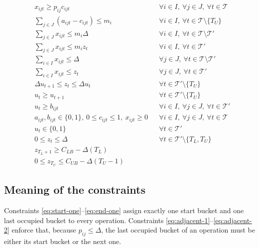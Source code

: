 \documentclass[11pt]{article}
\begin{document}
\begin{subequations}
\begin{align}
& x_{ijt} \ge p_{ij} c_{ijt} && \forall i \in I, \ \forall j \in J, \ \forall t \in \mathcal{T}
\label{eq:same-bucket-activation} \\
& \sum_{j \in J} (a_{ijt}-c_{ijt}) \leq m_i && \forall i \in I, \ \forall t \in \mathcal{T} \setminus \{T_U\}
\label{eq:machine-capacity} \\
& \sum_{j\in J} x_{ijt} \le m_i\Delta && \forall i\in I,\ \forall t \in \mathcal{T} \setminus \mathcal{T}' 
\label{eq:stage-capacity}\\
& \sum_{j\in J} x_{ijt} \leq m_i z_t  && \forall i\in I, \ \forall t \in \mathcal{T}'
\label{eq:z-average}\\
& \sum_{i\in I} x_{ijt} \le \Delta && \forall j\in J,\ \forall t \in \mathcal{T} \setminus \mathcal{T}'
\label{eq:job-bucket-capacity}\\
& \sum_{i \in I} x_{ijt} \leq z_t && \forall j\in J, \ \forall t \in \mathcal{T}'
\label{eq:z-single}\\
& \Delta u_{t+1} \leq z_t \leq \Delta u_t && \forall t \in \mathcal{T}' \setminus \{T_U\} 
\label{eq:u-z-relationship} \\
& u_{t} \geq u_{t+1} && \forall t \in \mathcal{T}' \setminus \{T_U\}
\label{eq:u-left-aligned} \\
& u_t \geq b_{ijt} && \forall i \in I, \ \forall j \in J, \ \forall t \in \mathcal{T}' 
\label{eq:u-b-relationship} \\
& a_{ijt},b_{ijt}\in\{0,1\},\ 0 \le c_{ijt} \le 1, \ x_{ijt}\ge 0 && \forall i\in I,\ \forall j\in J,\ \forall t \in \mathcal{T} 
\label{eq:domain-1}\\
& u_t \in \{0, 1\} && \forall t \in \mathcal{T}'
\label{eq:domain-2} \\
& 0\le z_t \le \Delta && \forall t \in \mathcal{T}' \setminus \{T_L, T_U\}
\label{eq:domain-3} \\
& z_{T_L+1} \geq C_{LB} - \Delta(T_L) 
\label{eq:domain-4} \\
& 0\le z_{T_U} \le C_{UB} - \Delta(T_U-1)
\label{eq:domain-5} 
\end{align}
\end{subequations}

\subsection*{Meaning of the constraints}

Constraints \eqref{eq:start-one}--\eqref{eq:end-one} assign exactly one start bucket and one last occupied bucket to every operation.
Constraints \eqref{eq:adjacent-1}--\eqref{eq:adjacent-2} enforce that, because $p_{ij}\le \Delta$, the last occupied bucket of an operation must be either its start bucket or the next one.
\end{document}
